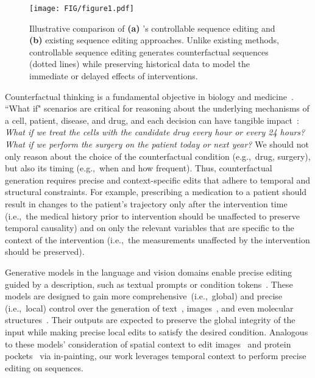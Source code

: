 \begin{figure}[ht]
\begin{center}
\centerline{\texttt{[image: FIG/figure1.pdf]}}
\caption{Illustrative comparison of \textbf{(a)} \name's controllable sequence editing and \textbf{(b)} existing sequence editing approaches. Unlike existing methods, controllable sequence editing generates counterfactual sequences (dotted lines) while preserving historical data to model the immediate or delayed effects of interventions.}
\label{fig:problem}
\end{center}
\vskip -0.35in
\end{figure}


Counterfactual thinking is a fundamental objective in biology and medicine~\cite{lee2024clinical}. ``What if" scenarios are critical for reasoning about the underlying mechanisms of a cell, patient, disease, and drug, and each decision can have tangible impact~\cite{bunne2024build, lee2024clinical}: \textit{What if we treat the cells with the candidate drug every hour or every 24 hours? What if we perform the surgery on the patient today or next year?} We should not only reason about the choice of the counterfactual condition (e.g.,~drug, surgery), but also its timing (e.g.,~when and how frequent). Thus, counterfactual generation requires precise and context-specific edits that adhere to temporal and structural constraints. For example, prescribing a medication to a patient should result in changes to the patient's trajectory only after the intervention time (i.e.,~the medical history prior to intervention should be unaffected to preserve temporal causality) and on only the relevant variables that are specific to the context of the intervention (i.e.,~the measurements unaffected by the intervention should be preserved).



Generative models in the language and vision domains enable precise editing guided by a description, such as textual prompts or condition tokens~\cite{zhang2023adding, gao2023editanything, ravi2024sam2, gong2024text, niu2024mitigating, gu2024token, zhou2024virtual}. These models are designed to gain more comprehensive~(i.e.,~global) and precise (i.e.,~local) control over the generation of text~\cite{chatzi2024counterfactual, niu2024mitigating, gu2024token, zhou2024virtual}, images~\cite{zhang2023adding, gao2023editanything, ravi2024sam2}, and even molecular structures~\cite{gong2024text, dauparas2022robust, zhang2024efficient}. Their outputs are expected to preserve the global integrity of the input while making precise local edits to satisfy the desired condition. Analogous to these models' consideration of spatial context to edit images~\cite{zhang2023adding, gao2023editanything} and protein pockets~\cite{dauparas2022robust, zhang2024efficient} via in-painting, our work leverages temporal context to perform precise editing on sequences. 



